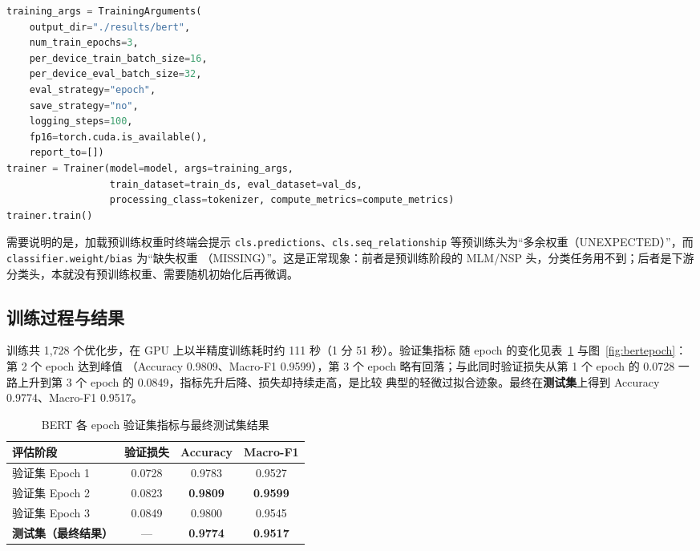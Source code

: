 \documentclass[a4paper]{article}
\begin{document}
\begin{lstlisting}[language=Python]
training_args = TrainingArguments(
    output_dir="./results/bert",
    num_train_epochs=3,
    per_device_train_batch_size=16,
    per_device_eval_batch_size=32,
    eval_strategy="epoch",
    save_strategy="no",
    logging_steps=100,
    fp16=torch.cuda.is_available(),
    report_to=[])
trainer = Trainer(model=model, args=training_args,
                  train_dataset=train_ds, eval_dataset=val_ds,
                  processing_class=tokenizer, compute_metrics=compute_metrics)
trainer.train()
\end{lstlisting}

需要说明的是，加载预训练权重时终端会提示 \texttt{cls.predictions}、\texttt{cls.seq\_relationship}
等预训练头为“多余权重（UNEXPECTED）”，而 \texttt{classifier.weight/bias} 为“缺失权重
（MISSING）”。这是正常现象：前者是预训练阶段的 MLM/NSP 头，分类任务用不到；后者是下游
分类头，本就没有预训练权重、需要随机初始化后再微调。

\subsection{训练过程与结果}

训练共 1{,}728 个优化步，在 GPU 上以半精度训练耗时约 111 秒（1 分 51 秒）。验证集指标
随 epoch 的变化见表~\ref{tab:bert-epoch} 与图~\ref{fig:bertepoch}：第 2 个 epoch 达到峰值
（Accuracy 0.9809、Macro-F1 0.9599），第 3 个 epoch 略有回落；与此同时验证损失从第 1 个
epoch 的 0.0728 一路上升到第 3 个 epoch 的 0.0849，指标先升后降、损失却持续走高，是比较
典型的轻微过拟合迹象。最终在\textbf{测试集}上得到 Accuracy 0.9774、Macro-F1 0.9517。

\begin{table}[H]
  \centering
  \caption{BERT 各 epoch 验证集指标与最终测试集结果}
  \label{tab:bert-epoch}
  \begin{tabular}{l c c c}
    \toprule
    评估阶段 & 验证损失 & Accuracy & Macro-F1 \\
    \midrule
    验证集 Epoch 1 & 0.0728 & 0.9783 & 0.9527 \\
    验证集 Epoch 2 & 0.0823 & \textbf{0.9809} & \textbf{0.9599} \\
    验证集 Epoch 3 & 0.0849 & 0.9800 & 0.9545 \\
    \midrule
    \textbf{测试集（最终结果）} & --- & \textbf{0.9774} & \textbf{0.9517} \\
    \bottomrule
  \end{tabular}
\end{table}
\end{document}
